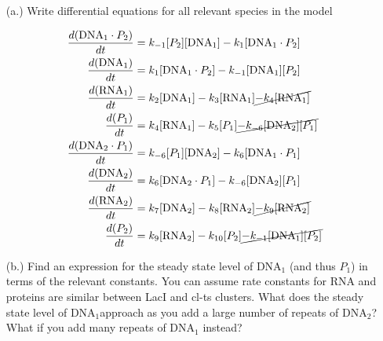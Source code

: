 \documentclass[11pt]{article}
\begin{document}
\begin{itemize}

\item[(a.)]Write differential equations for all relevant species in the model

\begin{equation*}
  \begin{aligned}
  \frac{d(\mbox{DNA}_1\cdot P_2)}{dt}&=k_{-1}[P_2][\mbox{DNA}_1] -k_1 [\mbox{DNA}_1\cdot P_2]\\
  \frac{d(\mbox{DNA}_1)}{dt}&=k_1[\mbox{DNA}_1\cdot P_2]-k_{-1}[\mbox{DNA}_1][P_2]\\
  \frac{d(\mbox{RNA}_1)}{dt}&=k_2[\mbox{DNA}_1]-k_3[\mbox{RNA}_1]\cancel{-k_4[\mbox{RNA}_1]}\\
  \frac{d(P_1)}{dt}&=k_4[\mbox{RNA}_1]-k_5[P_1] \cancel{-k_{-6}[\mbox{DNA}_2][P_1]}\\
  \frac{d(\mbox{DNA}_2\cdot P_1)}{dt}&=k_{-6}[P_1][\mbox{DNA}_2] -k_6 [\mbox{DNA}_1\cdot P_1]\\
  \frac{d(\mbox{DNA}_2)}{dt}&=k_6[\mbox{DNA}_2\cdot P_1]-k_{-6}[\mbox{DNA}_2][P_1]\\
  \frac{d(\mbox{RNA}_2)}{dt}&=k_7[\mbox{DNA}_2]-k_8[\mbox{RNA}_2]\cancel{-k_9[\mbox{RNA}_2]}\\
  \frac{d(P_2)}{dt}&=k_9[\mbox{RNA}_2]-k_{10}[P_2] \cancel{-k_{-1}[\mbox{DNA}_1][P_2]}
  \end{aligned}
\end{equation*}


\item[(b.)]Find an expression for the steady state level of DNA$_{1}$
 (and thus $P_{1}$) in terms of the relevant constants. You can assume rate constants for RNA and proteins are similar between LacI and cl-ts clusters. What does the steady state level of DNA$_{1}$approach as you add a large number of repeats of DNA$_{2}$? What if you add many repeats of DNA$_{1}$ instead? 


\end{itemize}
\end{document}

